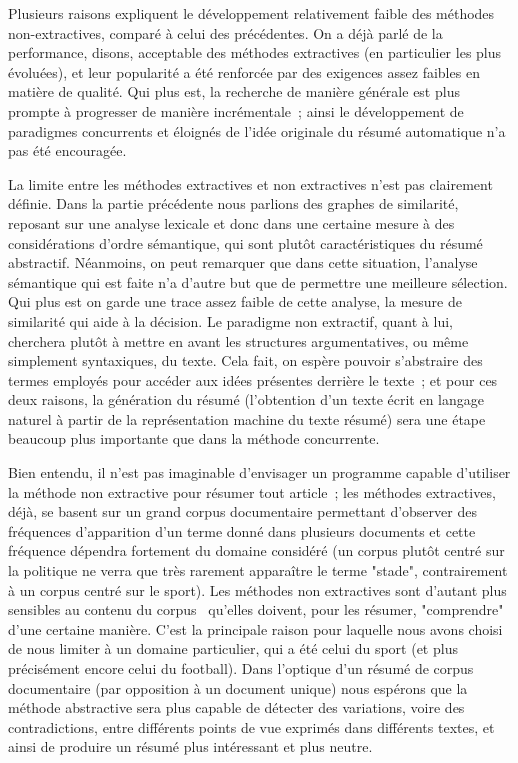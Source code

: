 \documentclass[a4paper, 12pt]{article}
\begin{document}
Plusieurs raisons expliquent le développement relativement faible des méthodes non-extractives, comparé à celui des précédentes. On a déjà parlé de la performance, disons, acceptable des méthodes extractives (en particulier les plus évoluées), et leur popularité a été renforcée par des exigences assez faibles en matière de qualité. Qui plus est, la recherche de manière générale est plus prompte à progresser de manière incrémentale~; ainsi le développement de paradigmes concurrents et éloignés de l'idée originale du résumé automatique n'a pas été encouragée.

La limite entre les méthodes extractives et non extractives n'est pas clairement définie. Dans la partie précédente nous parlions des graphes de similarité, reposant sur une analyse lexicale et donc dans une certaine mesure à des considérations d'ordre sémantique, qui sont plutôt caractéristiques du résumé abstractif. Néanmoins, on peut remarquer que dans cette situation, l'analyse sémantique qui est faite n'a d'autre but que de permettre une meilleure sélection. Qui plus est on garde une trace assez faible de cette analyse, la mesure de similarité qui aide à la décision. Le paradigme non extractif, quant à lui, cherchera plutôt à mettre en avant les structures argumentatives, ou même simplement syntaxiques, du texte. Cela fait, on espère pouvoir s'abstraire des termes employés pour accéder aux idées présentes derrière le texte~; et pour ces deux raisons, la génération du résumé (l'obtention d'un texte écrit en langage naturel à partir de la représentation machine du texte résumé) sera une étape beaucoup plus importante que dans la méthode concurrente.

Bien entendu, il n'est pas imaginable d'envisager un programme capable d'utiliser la méthode non extractive pour résumer tout article~; les méthodes extractives, déjà, se basent sur un grand corpus documentaire permettant d'observer des fréquences d'apparition d'un terme donné dans plusieurs documents et cette fréquence dépendra fortement du domaine considéré (un corpus plutôt centré sur la politique ne verra que très rarement apparaître le terme "stade", contrairement à un corpus centré sur le sport). Les méthodes non extractives sont d'autant plus sensibles au contenu du corpus~\cite[p.1774]{jones_automatic_2007} qu'elles doivent, pour les résumer, "comprendre" d'une certaine manière. C'est la principale raison pour laquelle nous avons choisi de nous limiter à un domaine particulier, qui a été celui du sport (et plus précisément encore celui du football). Dans l'optique d'un résumé de corpus documentaire (par opposition à un document unique) nous espérons que la méthode abstractive sera plus capable de détecter des variations, voire des contradictions, entre différents points de vue exprimés dans différents textes, et ainsi de produire un résumé plus intéressant et plus neutre.\\
\end{document}
